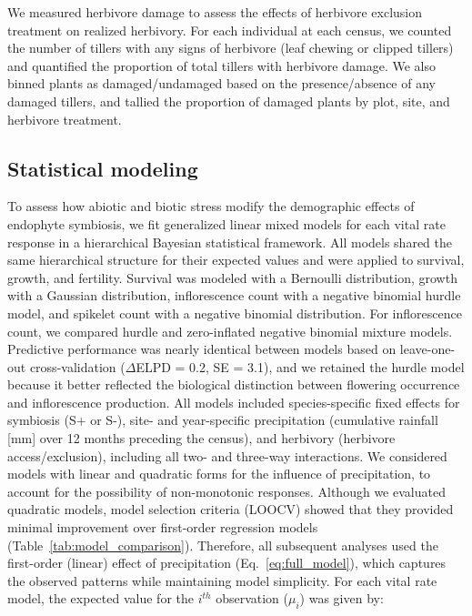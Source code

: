 \documentclass[12pt]{article}\usepackage[]{graphicx}\usepackage[dvipsnames]{xcolor}
\begin{document}
We measured herbivore damage to assess the effects of herbivore exclusion treatment on realized herbivory. 
For each individual at each census, we counted the number of tillers with any signs of herbivore (leaf chewing or clipped tillers) and quantified the proportion of total tillers with herbivore damage. 
We also binned plants as damaged/undamaged based on the presence/absence of any damaged tillers, and tallied the proportion of damaged plants by plot, site, and herbivore treatment.

\subsection*{Statistical modeling}
To assess how abiotic and biotic stress modify the demographic effects of endophyte symbiosis, we fit generalized linear mixed models for each vital rate response in a hierarchical Bayesian statistical framework. %
All models shared the same hierarchical structure for their expected values and were applied to survival, growth, and fertility.
Survival was modeled with a Bernoulli distribution, growth with a Gaussian distribution, inflorescence count with a negative binomial hurdle model, and spikelet count with a negative binomial distribution. 
For inflorescence count, we compared hurdle and zero-inflated negative binomial mixture models. Predictive performance was nearly identical between models based on leave-one-out cross-validation ($\Delta$ELPD = 0.2, SE = 3.1), and we retained the hurdle model because it better reflected the biological distinction between flowering occurrence and inflorescence production.
All models included species-specific fixed effects for symbiosis (S+ or S-), site- and year-specific precipitation (cumulative rainfall [mm] over 12 months preceding the census), and herbivory (herbivore access/exclusion), including all two- and three-way interactions. 
We considered models with linear and quadratic forms for the influence of precipitation, to account for the possibility of non-monotonic responses. 
Although we evaluated quadratic models, model selection criteria (LOOCV) showed that they provided minimal improvement over first-order regression models (Table~\ref{tab:model_comparison}). 
Therefore, all subsequent analyses used the first-order (linear) effect of precipitation (Eq.~\ref{eq:full_model}), which captures the observed patterns while maintaining model simplicity.
For each vital rate model, the expected value for the $i^{th}$ observation ($\mu_{i}$) was given by:
\end{document}
